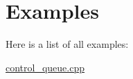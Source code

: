 \section{Examples}
Here is a list of all examples\-:\begin{DoxyCompactItemize}
\item 
\hyperlink{control_queue_8cpp-example}{control\-\_\-queue.\-cpp}
\end{DoxyCompactItemize}
